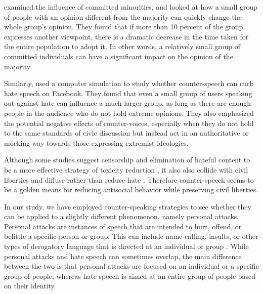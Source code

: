 \documentclass[preprint,12pt]{elsarticle}
\begin{document}
 \citep{xie2011social} examined the influence of committed minorities, and looked at how a small group of people with an opinion different from the majority can quickly change the whole group's opinion. They found that if more than 10 percent of the group expresses another viewpoint, there is a dramatic decrease in the time taken for the entire population to adopt it. In other words, a relatively small group of committed individuals can have a significant impact on the opinion of the majority. 

Similarly, \citep{schieb2016governing} used a computer simulation to study whether counter-speech can curb hate speech on Facebook. They found that even a small group of users speaking out against hate can influence a much larger group, as long as there are enough people in the audience who do not hold extreme opinions. They also emphasized the potential negative effects of counter-voices, especially when they do not hold to the same standards of civic discussion but instead act in an authoritative or mocking way towards those expressing extremist ideologies. 

Although some studies suggest censorship and elimination of hateful content to be a more effective strategy of toxicity reduction \citep{alvarez2018normative}, it also also collide with civil liberties and diffuse rather than reduce hate \citep{chandrasekharan2017you}. Therefore counter-speech seems to be a golden means for reducing antisocial behavior while preserving civil liberties. 


In our study, we have employed counter-speaking strategies to see whether they can be applied to a slightly different phenomenon, namely personal attacks. Personal attacks are instances of speech that are intended to hurt, offend, or belittle a specific person or group. This can include name-calling, insults, or other types of derogatory language that is directed at an individual or group \citep{bilewicz2021artificial}. While personal attacks and hate speech can sometimes overlap, the main difference between the two is that personal attacks are focused on an individual or a specific group of people, whereas hate speech is aimed at an entire group of people based on their identity.


\end{document}
